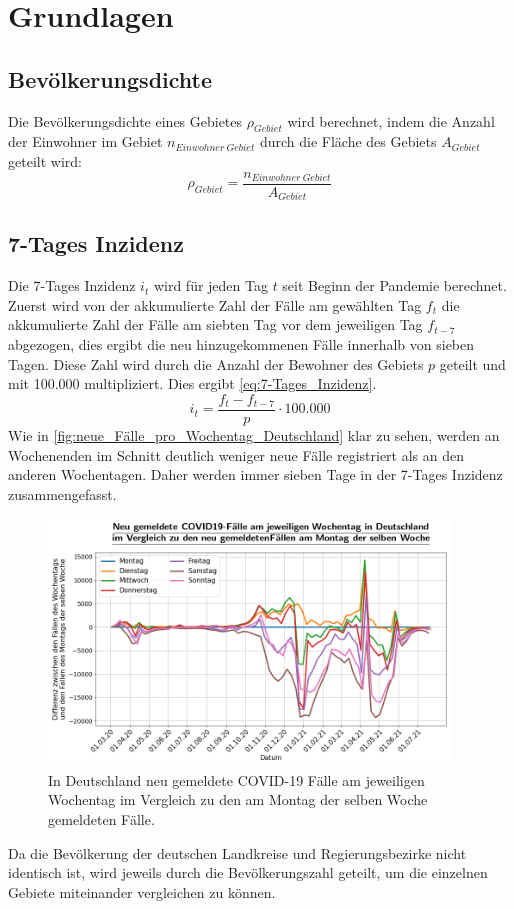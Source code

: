 \chapter{Grundlagen}\label{chap:Grundlagen}
\section{Bevölkerungsdichte}
Die Bevölkerungsdichte eines Gebietes $\rho_{Gebiet}$ wird berechnet, indem die Anzahl der Einwohner im Gebiet $n_{Einwohner\ Gebiet}$ durch die Fläche des Gebiets $A_{Gebiet}$ geteilt wird:
\begin{equation}\label{eq:Bevölkerungsdichte}
    \rho_{Gebiet} = \frac{n_{Einwohner\  Gebiet}}{A_{Gebiet}}
\end{equation}
\section{7-Tages Inzidenz}\label{sec:Datenaufbereitung}
Die 7-Tages Inzidenz $i_t$ wird für jeden Tag $t$ seit Beginn der Pandemie berechnet.
Zuerst wird von der akkumulierte Zahl der Fälle am gewählten Tag $f_t$ die akkumulierte Zahl der Fälle am siebten Tag vor dem jeweiligen Tag $f_{t-7}$ abgezogen, dies ergibt die neu hinzugekommenen Fälle innerhalb von sieben Tagen.
Diese Zahl wird durch die Anzahl der Bewohner des Gebiets $p$ geteilt und mit 100.000 multipliziert. Dies ergibt \autoref{eq:7-Tages_Inzidenz}.
\begin{equation}\label{eq:7-Tages_Inzidenz}
    i_t= \frac{f_t-f_{t-7}}{p}\cdot 100.000
\end{equation}
Wie in \autoref{fig:neue_Fälle_pro_Wochentag_Deutschland} klar zu sehen, werden an Wochenenden im Schnitt deutlich weniger neue Fälle registriert als an den anderen Wochentagen.
Daher werden immer sieben Tage in der 7-Tages Inzidenz zusammengefasst.
\begin{figure}[H]
    \centering
    \includegraphics[width=0.95\textwidth]{figures/Grundlagen/neue_Fälle_pro_Wochentag_Deutschland.png}
    \caption{In Deutschland neu gemeldete COVID-19 Fälle am jeweiligen Wochentag im Vergleich zu den am Montag der selben Woche gemeldeten Fälle.}
    \label{fig:neue_Fälle_pro_Wochentag_Deutschland}
\end{figure}
Da die Bevölkerung der deutschen Landkreise und Regierungsbezirke nicht identisch ist, wird jeweils durch die Bevölkerungszahl geteilt, um die einzelnen Gebiete miteinander vergleichen zu können.


